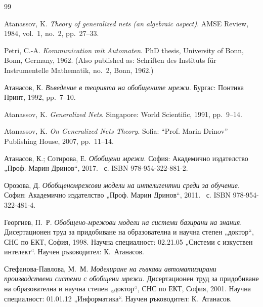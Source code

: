 \clearpage
{}
{}

\begin{thebibliography}{99}


Atanassov, K.
\newblock \emph{Theory of generalized nets (an algebraic aspect)}.
\newblock AMSE Review, 1984, vol.~1, no.~2, pp.~27--33.

Petri, C.-A.
\newblock \emph{Kommunication mit Automaten}.
\newblock PhD thesis, University of Bonn, Bonn, Germany, 1962.
\newblock (Also published as: Schriften des Instituts f{\"u}r Instrumentelle Mathematik, no.~2, Bonn, 1962.)

Атанасов, К.
\newblock \emph{Въведение в теорията на обобщените мрежи}.
\newblock Бургас: Понтика Принт, 1992, pp.~7--10.

Atanassov, K.
\newblock \emph{Generalized Nets}.
\newblock Singapore: World Scientific, 1991, pp.~9--14.

Atanassov, K.
\newblock \emph{On Generalized Nets Theory}.
\newblock Sofia: ``Prof. Marin Drinov'' Publishing House, 2007, pp.~11--14.

Атанасов, К.; Сотирова, Е.
\newblock \emph{Обобщени мрежи}.
\newblock \textnormal{София:} Академично издателство „Проф. Марин Дринов“, 2017.
~с.
\newblock ISBN 978-954-322-881-2.

Орозова, Д.
\newblock \emph{Обобщеномрежови модели на интелигентни среди за обучение}.
\newblock \textnormal{София:} Академично издателство „Проф. Марин Дринов“, 2011.
~с.
\newblock ISBN 978-954-322-481-4.

Георгиев, П.~Р.
\newblock \emph{Обобщено-мрежови модели на системи базирани на знания}.
\newblock Дисертационен труд за придобиване на образователна и научна степен „доктор“,
СНС по ЕКТ, София, 1998.
\newblock Научна специалност: 02.21.05 „Системи с изкуствен интелект“.
\newblock Научен ръководител: К.~Атанасов.

Стефанова-Павлова, М.~М.
\newblock \emph{Моделиране на гъвкави автоматизирани производствени системи с обобщени мрежи}.
\newblock Дисертационен труд за придобиване на образователна и научна степен „доктор“,
СНС по ЕКТ, София, 2001.
\newblock Научна специалност: 01.01.12 „Информатика“.
\newblock Научен ръководител: К.~Атанасов.


\end{thebibliography}
